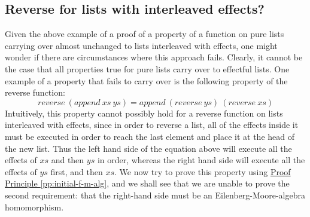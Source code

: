 \documentclass{jfp1}
\newcommand{\proofprinref}[1]{\hyperref[#1]{Proof Principle \ref*{#1}}}
\begin{document}
\subsection{Reverse for lists with interleaved effects?}
\label{sec:reverse}

Given the above example of a proof of a property of a function on pure
lists carrying over almost unchanged to lists interleaved with
effects, one might wonder if there are circumstances where this
approach fails. Clearly, it cannot be the case that all properties
true for pure lists carry over to effectful lists. One example of a
property that fails to carry over is the following property of the
reverse function:
\begin{displaymath}
  \mathit{reverse}~(\mathit{append}~\mathit{xs}~\mathit{ys}) = \mathit{append}~(\mathit{reverse}~\mathit{ys})~(\mathit{reverse}~\mathit{xs})
\end{displaymath}
Intuitively, this property cannot possibly hold for a reverse function
on lists interleaved with effects, since in order to reverse a list,
all of the effects inside it must be executed in order to reach the
last element and place it at the head of the new list. Thus the left
hand side of the equation above will execute all the effects of
$\mathit{xs}$ and then $\mathit{ys}$ in order, whereas the right hand
side will execute all the effects of $\mathit{ys}$ first, and then
$\mathit{xs}$. We now try to prove this property using
\proofprinref{pp:initial-f-m-alg}, and we shall see that we are unable
to prove the second requirement: that the right-hand side must be an
Eilenberg-Moore-algebra homomorphism.
\end{document}
